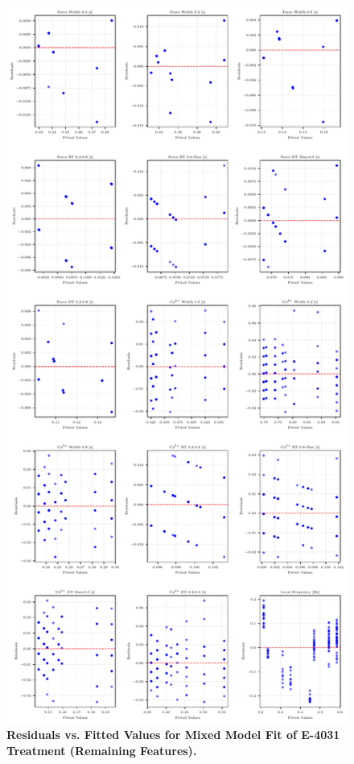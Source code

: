 \documentclass{report}
\begin{document}
    \begin{figure}
        \centering
        \includegraphics[width=1\textwidth,height=0.99\textheight, keepaspectratio]{plots/chapter_5/e4031/resid_mixed_subset_15.pdf}
        \caption[Residuals vs. Fitted Values for Mixed Model Fit of E-4031 Treatment (Remaining Features)]{\textbf{Residuals vs. Fitted Values for Mixed Model Fit of E-4031 Treatment (Remaining Features).}}
        \label{fig:e4031-remaining-resid}
    \end{figure}
\end{document}
